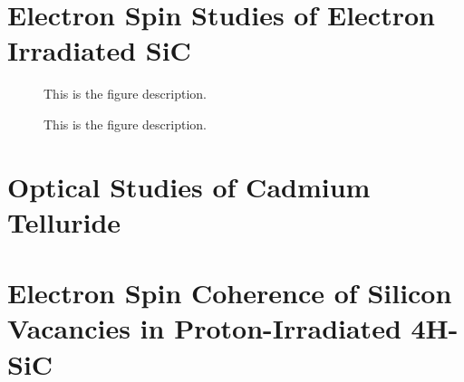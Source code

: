 \documentclass[oneside, astronomy, noacknowlegments]{BYUPhys}
\begin{document}
\begin{appendices}











\chapter{Electron Spin Studies of Electron Irradiated SiC}
\label{chpt:AppendA}

\begin{figure}
    \caption[Electron-irradiated SiC lifetime  summary]{\label{fig:e17results}
     This is the figure description.}
 \end{figure}

\begin{figure}
    \caption[ODMR/Photoluminescence vs temperature]{\label{fig:ODMRPL}
     This is the figure description.}
 \end{figure}











\chapter{Optical Studies of Cadmium Telluride}
\label{chpt:AppendB}









\chapter{Electron Spin Coherence of Silicon Vacancies in Proton-Irradiated 4H-SiC}
\label{chpt:AppendC}

\end{appendices}
\end{document}
